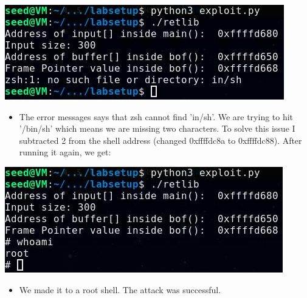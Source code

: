 \documentclass[11pt]{article}
\begin{document}
\begin{center}
\includegraphics[width=.9\linewidth]{./images/4.jpg}
\end{center}
\begin{itemize}
\item The error messages says that zsh cannot find 'in/sh'. We are trying to hit '/bin/sh' which means we are missing two characters. To solve this issue I subtracted 2 from the shell address (changed 0xffffdc8a to 0xffffdc88). After running it again, we get:
\end{itemize}
\begin{center}
\includegraphics[width=.9\linewidth]{./images/5.jpg}
\end{center}
\begin{itemize}
\item We made it to a root shell. The attack was successful.
\end{itemize}
\end{document}
